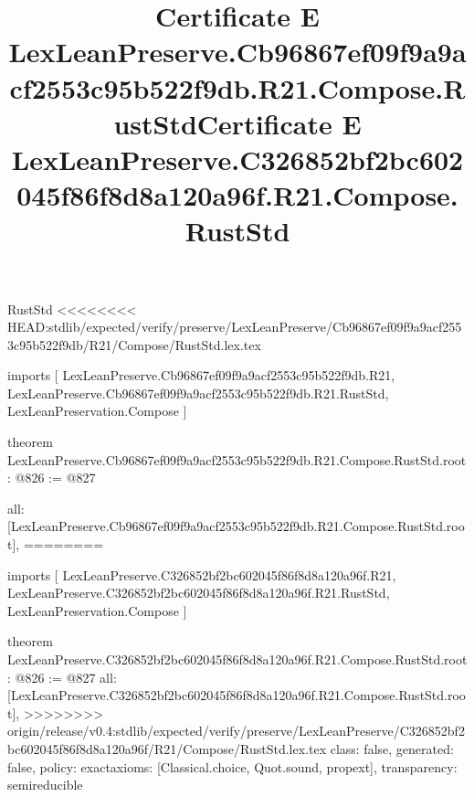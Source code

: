 \begin{lexlean}{RustStd}
<<<<<<<< HEAD:stdlib/expected/verify/preserve/LexLeanPreserve/Cb96867ef09f9a9acf2553c95b522f9db/R21/Compose/RustStd.lex.tex
\title{Certificate E LexLeanPreserve.Cb96867ef09f9a9acf2553c95b522f9db.R21.Compose.RustStd}
\begin{coremodule}
imports [
  LexLeanPreserve.Cb96867ef09f9a9acf2553c95b522f9db.R21,
  LexLeanPreserve.Cb96867ef09f9a9acf2553c95b522f9db.R21.RustStd,
  LexLeanPreservation.Compose
]

theorem LexLeanPreserve.Cb96867ef09f9a9acf2553c95b522f9db.R21.Compose.RustStd.root : @826 := @827 {
  all: [LexLeanPreserve.Cb96867ef09f9a9acf2553c95b522f9db.R21.Compose.RustStd.root],
========
\title{Certificate E LexLeanPreserve.C326852bf2bc602045f86f8d8a120a96f.R21.Compose.RustStd}
\begin{coremodule}
imports [
  LexLeanPreserve.C326852bf2bc602045f86f8d8a120a96f.R21,
  LexLeanPreserve.C326852bf2bc602045f86f8d8a120a96f.R21.RustStd,
  LexLeanPreservation.Compose
]

theorem LexLeanPreserve.C326852bf2bc602045f86f8d8a120a96f.R21.Compose.RustStd.root : @826 := @827 {
  all: [LexLeanPreserve.C326852bf2bc602045f86f8d8a120a96f.R21.Compose.RustStd.root],
>>>>>>>> origin/release/v0.4:stdlib/expected/verify/preserve/LexLeanPreserve/C326852bf2bc602045f86f8d8a120a96f/R21/Compose/RustStd.lex.tex
  class: false,
  generated: false,
  policy: exact{axioms: [Classical.choice, Quot.sound, propext]},
  transparency: semireducible
}


\end{coremodule}}
\end{coremodule}
\end{lexlean}
